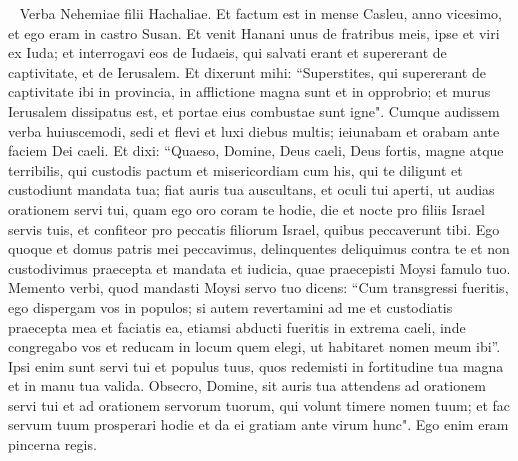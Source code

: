 
\begin{biblechapter}   
\verse Verba Nehemiae filii Hachaliae. Et factum est in mense Casleu, anno vicesimo, et ego eram in castro Susan. 
\verse Et venit Hanani unus de fratribus meis, ipse et viri ex Iuda; et interrogavi eos de Iudaeis, qui salvati erant et supererant de captivitate, et de Ierusalem. 
\verse Et dixerunt mihi: “Superstites, qui supererant de captivitate ibi in provincia, in afflictione magna sunt et in opprobrio; et murus Ierusalem dissipatus est, et portae eius combustae sunt igne". 
\verse Cumque audissem verba huiuscemodi, sedi et flevi et luxi diebus multis; ieiunabam et orabam ante faciem Dei caeli. 
\verse Et dixi: “Quaeso, Domine, Deus caeli, Deus fortis, magne atque terribilis, qui custodis pactum et misericordiam cum his, qui te diligunt et custodiunt mandata tua; 
\verse fiat auris tua auscultans, et oculi tui aperti, ut audias orationem servi tui, quam ego oro coram te hodie, die et nocte pro filiis Israel servis tuis, et confiteor pro peccatis filiorum Israel, quibus peccaverunt tibi. Ego quoque et domus patris mei peccavimus, 
\verse delinquentes deliquimus contra te et non custodivimus praecepta et mandata et iudicia, quae praecepisti Moysi famulo tuo. 
\verse Memento verbi, quod mandasti Moysi servo tuo dicens: “Cum transgressi fueritis, ego dispergam vos in populos; 
\verse si autem revertamini ad me et custodiatis praecepta mea et faciatis ea, etiamsi abducti fueritis in extrema caeli, inde congregabo vos et reducam in locum quem elegi, ut habitaret nomen meum ibi”. 
\verse Ipsi enim sunt servi tui et populus tuus, quos redemisti in fortitudine tua magna et in manu tua valida. 
\verse Obsecro, Domine, sit auris tua attendens ad orationem servi tui et ad orationem servorum tuorum, qui volunt timere nomen tuum; et fac servum tuum prosperari hodie et da ei gratiam ante virum hunc". Ego enim eram pincerna regis. 
\end{biblechapter}

